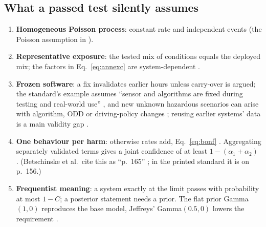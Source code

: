 \documentclass[11pt,a4paper]{article}
\begin{document}
\subsection{What a passed test silently assumes}
\begin{enumerate}
\item \textbf{Homogeneous Poisson process}: constant rate and independent events (the Poisson assumption in \cite[Sec.~IV-B(a)]{putze2023}).
\item \textbf{Representative exposure}: the tested mix of conditions equals the deployed mix; the factors in Eq.~\eqref{eq:annexc} are system-dependent \cite[Sec.~IV-B(b)--(c)]{putze2023}.
\item \textbf{Frozen software}: a fix invalidates earlier hours unless carry-over is argued; the standard's example assumes ``sensor and algorithms are fixed during testing and real-world use'' \cite[C.6.3.2, p.~154]{iso21448}, and new unknown hazardous scenarios can arise with algorithm, ODD or driving-policy changes \cite[11.3, Note~1, p.~52]{iso21448}; reusing earlier systems' data is a main validity gap \cite[Sec.~V, RA ``Decomposition of Hazardous Behavior'' and ``Bayesian Statistics'']{betschinske2025}.
\item \textbf{One behaviour per harm}: otherwise rates add, Eq.~\eqref{eq:bonf} \cite[Sec.~IV-B(b)]{putze2023}. Aggregating separately validated terms gives a joint confidence of at least $1-(\alpha_1+\alpha_2)$ \cite[C.6.3.2, Example~1 and footnote~1, p.~156]{iso21448}. (Betschinske et al.\ cite this as ``p.~165'' \cite[Sec.~V, RA ``Decomposition of Hazardous Behavior'']{betschinske2025}; in the printed standard it is on p.~156.)
\item \textbf{Frequentist meaning}: a system exactly at the limit passes with probability at most $1-C$; a posterior statement needs a prior. The flat prior Gamma$(1,0)$ reproduces the base model, Jeffreys' Gamma$(0.5,0)$ lowers the requirement \cite[Sec.~V, RA ``Bayesian Statistics'']{betschinske2025}.
\end{enumerate}
\end{document}
